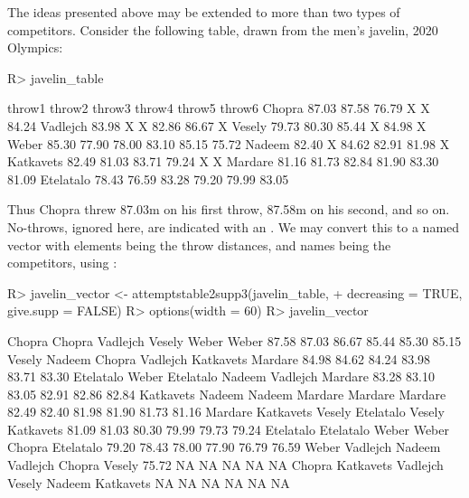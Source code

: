 \documentclass[article]{jss}
\begin{document}
The ideas presented above may be extended to more than two types of
competitors.  Consider the following table, drawn from the men's
javelin, 2020 Olympics:
%
\begin{Schunk}
\begin{Sinput}
R> javelin_table
\end{Sinput}
\begin{Soutput}
          throw1 throw2 throw3 throw4 throw5 throw6
Chopra     87.03  87.58  76.79      X      X  84.24
Vadlejch   83.98      X      X  82.86  86.67      X
Vesely     79.73  80.30  85.44      X  84.98      X
Weber      85.30  77.90  78.00  83.10  85.15  75.72
Nadeem     82.40      X  84.62  82.91  81.98      X
Katkavets  82.49  81.03  83.71  79.24      X      X
Mardare    81.16  81.73  82.84  81.90  83.30  81.09
Etelatalo  78.43  76.59  83.28  79.20  79.99  83.05
\end{Soutput}
\end{Schunk}
%
Thus Chopra threw 87.03m on his first throw, 87.58m on his second, and
so on.  No-throws, ignored here, are indicated with an .  We
may convert this to a named vector with elements being the throw
distances, and names being the competitors, using
:
%
\begin{Schunk}
\begin{Sinput}
R> javelin_vector <- attemptstable2supp3(javelin_table,
+    decreasing = TRUE, give.supp = FALSE)
R> options(width = 60)
R> javelin_vector
\end{Sinput}
\begin{Soutput}
   Chopra    Chopra  Vadlejch    Vesely     Weber     Weber 
    87.58     87.03     86.67     85.44     85.30     85.15 
   Vesely    Nadeem    Chopra  Vadlejch Katkavets   Mardare 
    84.98     84.62     84.24     83.98     83.71     83.30 
Etelatalo     Weber Etelatalo    Nadeem  Vadlejch   Mardare 
    83.28     83.10     83.05     82.91     82.86     82.84 
Katkavets    Nadeem    Nadeem   Mardare   Mardare   Mardare 
    82.49     82.40     81.98     81.90     81.73     81.16 
  Mardare Katkavets    Vesely Etelatalo    Vesely Katkavets 
    81.09     81.03     80.30     79.99     79.73     79.24 
Etelatalo Etelatalo     Weber     Weber    Chopra Etelatalo 
    79.20     78.43     78.00     77.90     76.79     76.59 
    Weber  Vadlejch    Nadeem  Vadlejch    Chopra    Vesely 
    75.72        NA        NA        NA        NA        NA 
   Chopra Katkavets  Vadlejch    Vesely    Nadeem Katkavets 
       NA        NA        NA        NA        NA        NA 
\end{Soutput}
\end{Schunk}
\end{document}
